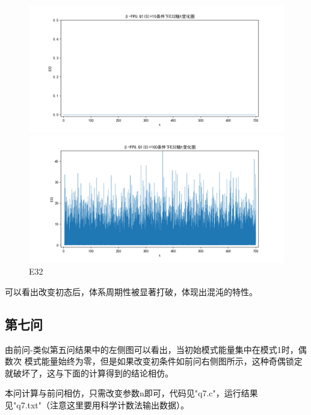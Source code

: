 \documentclass[10pt, a4paper]{article}
\begin{document}
    \begin{figure}[H]
        \begin{minipage}[t]{0.49\textwidth}
            \centering
            \includegraphics[width=\textwidth]{./q6_pics/cmp/E32.png}
        \end{minipage}
        \begin{minipage}[t]{0.49\textwidth}
            \centering
            \includegraphics[width=\textwidth]{./q6_pics/exp/E32.png}
        \end{minipage}
        \caption{E32}\label{fig:E32 in q6}
    \end{figure}

    可以看出改变初态后，体系周期性被显著打破，体现出混沌的特性。

    \subsection{第七问}
    由前问-类似第五问结果中的左侧图可以看出，当初始模式能量集中在模式1时，偶数次
    模式能量始终为零，但是如果改变初条件如前问右侧图所示，这种奇偶锁定就破坏了，这与下面的计算得到的结论相仿。

    本问计算与前问相仿，只需改变参数n即可，代码见"q7.c"，运行结果见"q7.txt"（注意这里要用科学计数法输出数据）。
\end{document}
